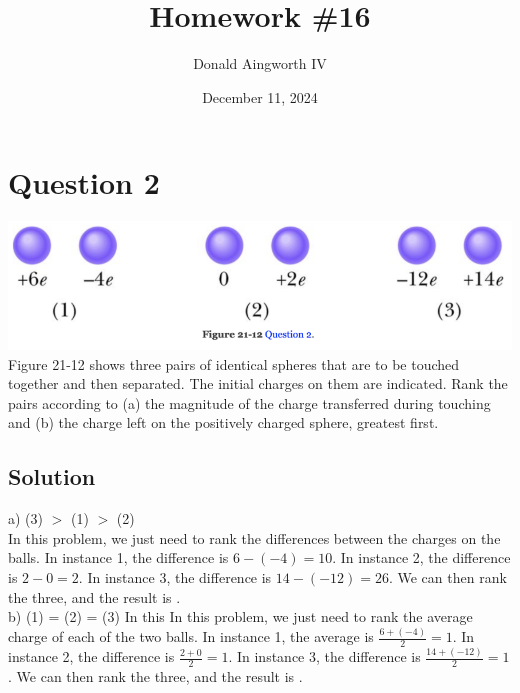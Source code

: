 \documentclass[12pt]{article}
\title{Homework \#16}
\author{Donald Aingworth IV}
\date{December 11, 2024}
\begin{document}

\maketitle

\pagebreak
\section*{Question 2}
\includegraphics[width=\textwidth]{picture_1.png}
Figure 21-12 shows three pairs of identical spheres that are to be touched together and then separated. The initial charges on them are indicated. Rank the pairs according to (a) the magnitude of the charge transferred during touching and (b) the charge left on the positively charged sphere, greatest first.

\subsection*{Solution}
a) (3) $>$ (1) $>$ (2)\\
In this problem, we just need to rank the differences between the charges on the balls. In instance 1, the difference is $6 - (-4) = 10$. In instance 2, the difference is $2 - 0 = 2$. In instance 3, the difference is $14 - (-12) = 26$. We can then rank the three, and the result is .\\
b) (1) = (2) = (3)
In this In this problem, we just need to rank the average charge of each of the two balls. In instance 1, the average is $\frac{6 + (-4)}{2} = 1$. In instance 2, the difference is $\frac{2 + 0}{2} = 1$. In instance 3, the difference is $\frac{14 + (-12)}{2} = 1$. We can then rank the three, and the result is .


\pagebreak
\end{document}
